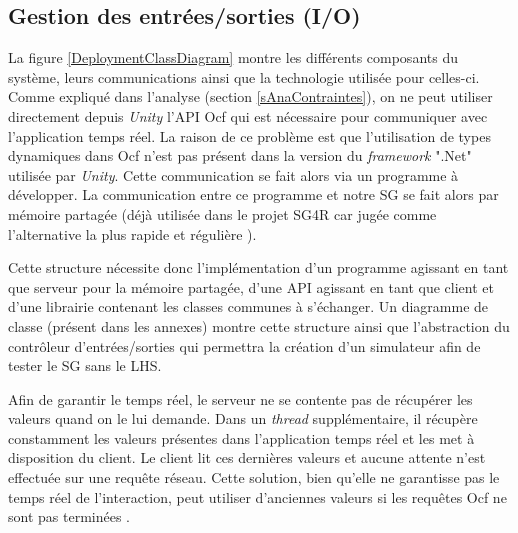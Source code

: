 	\subsection*{Gestion des entrées/sorties (I/O)}
		La figure \ref{DeploymentClassDiagram} montre les différents composants du système, leurs communications ainsi que la technologie utilisée pour celles-ci. Comme expliqué dans l'analyse (section \ref{sAnaContraintes}), on ne peut utiliser directement depuis \textit{Unity} l'API Ocf \cite{OcfClient_website} qui est nécessaire pour communiquer avec l'application temps réel. La raison de ce problème est que l'utilisation de types dynamiques dans Ocf n'est pas présent dans la version du \textit{framework} ".Net" utilisée par \textit{Unity}. Cette communication se fait alors via un programme à développer. La communication entre ce programme et notre SG se fait alors par mémoire partagée (déjà utilisée dans le projet SG4R car jugée comme l'alternative la plus rapide et régulière \cite{ZanniniRapport}).
		\medskip			
		
		\begin{minipage}{\linewidth}
			\label{DeploymentClassDiagram}
		\end{minipage}\medskip%
				
		Cette structure nécessite donc l'implémentation d'un programme agissant en tant que serveur pour la mémoire partagée, d'une API agissant en tant que client et d'une librairie contenant les classes communes à s'échanger. Un diagramme de classe (présent dans les annexes) montre cette structure ainsi que l'abstraction du contrôleur d'entrées/sorties qui permettra la création d'un simulateur afin de tester le SG sans le LHS.
		
		Afin de garantir le temps réel, le serveur ne se contente pas de récupérer les valeurs quand on le lui demande. Dans un \textit{thread} supplémentaire, il récupère constamment les valeurs présentes dans l'application temps réel et les met à disposition du client. Le client lit ces dernières valeurs et aucune attente n'est effectuée sur une requête réseau. Cette solution, bien qu'elle ne garantisse pas le temps réel de l'interaction, peut utiliser d'anciennes valeurs si les requêtes Ocf ne sont pas terminées \cite{ZanniniRapport}.